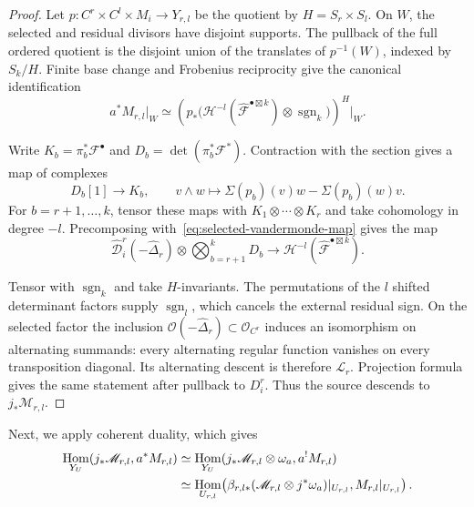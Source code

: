 \documentclass[11pt,letterpaper]{amsart}
\theoremstyle{plain}
\theoremstyle{definition}
\theoremstyle{remark}
\numberwithin{equation}{section}
\DeclareMathOperator{\Hom}{Hom}
\newcommand{\scrL}{\mathscr L}
\newcommand{\StacksTag}[1]{\href{https://stacks.math.columbia.edu/tag/#1}{Stacks Project, Tag~#1}}
\begin{document}
\begin{proof}
Let $p:C^r\times C^l\times M_i\to Y_{r,l}$ be the quotient by
$H=S_r\times S_l$.
On $W$, the selected and residual divisors have disjoint supports.
The pullback of the full ordered quotient is the disjoint union of the
translates of $p^{-1}(W)$, indexed by $S_k/H$.  Finite base change and
Frobenius reciprocity give the canonical identification
\begin{equation}\label{eq:fixed-splitting-target}
 a^*M_{r,l}|_W\simeq
 \left(p_*\bigl(\mathcal H^{-l}
       (\widehat{\mathcal F}^{\bullet\boxtimes k})
             \otimes\operatorname{sgn}_k\bigr)\right)^H\big|_W.
\end{equation}

Write $K_b=\pi_b^*\mathcal F^\bullet$ and
$D_b=\det(\pi_b^*\mathcal F^*)$.
Contraction with the section gives a map of complexes
\begin{equation}\label{eq:prop512-kernel-map}
 D_b[1]\longrightarrow K_b,\qquad
 v\wedge w\longmapsto\Sigma(p_b)(v)w-\Sigma(p_b)(w)v.
\end{equation}
For $b=r+1,\ldots,k$, tensor these maps with
$K_1\otimes\cdots\otimes K_r$ and take cohomology in degree $-l$.
Precomposing with~\eqref{eq:selected-vandermonde-map} gives the map
\[
 \widehat{\mathcal D}_i^r(-\widehat\Delta_r)
       \otimes\bigotimes_{b=r+1}^kD_b
 \longrightarrow
 \mathcal H^{-l}(\widehat{\mathcal F}^{\bullet\boxtimes k}).
\]


Tensor with $\operatorname{sgn}_k$ and take $H$-invariants.
The permutations of the $l$ shifted determinant factors supply
$\operatorname{sgn}_l$, which cancels the external residual sign.
On the selected factor the inclusion
$\mathcal O(-\widehat\Delta_r)\subset\mathcal O_{C^r}$ induces an
isomorphism on alternating summands: every alternating regular function
vanishes on every transposition diagonal.  Its alternating descent is
therefore $\scrL_r$.  Projection formula gives the same statement after
pullback to $D_i^r$.  Thus the source descends to $j_*\mathscr M_{r,l}$.
\end{proof}

Next, we apply coherent duality, which gives
\begin{align}
 \Hom_{Y_U}(j_*\mathscr M_{r,l},a^*M_{r,l})
 &\simeq
 \Hom_{Y_U}(j_*\mathscr M_{r,l}\otimes\omega_a,a^!M_{r,l})\notag\\
 &\simeq
 \Hom_{U_{r,l}}\!\left(
 \beta_{r,l*}(\mathscr M_{r,l}\otimes j^*\omega_a)|_{U_{r,l}},
 M_{r,l}|_{U_{r,l}}\right).
 \label{eq:finite-duality-Hom}
\end{align}
\end{document}
